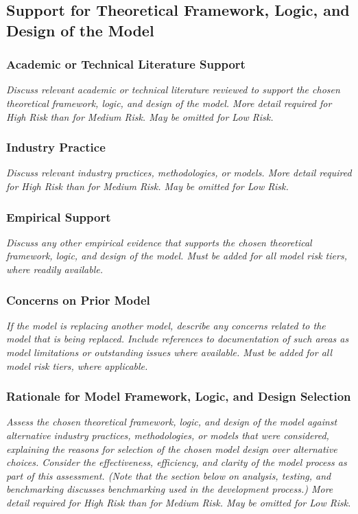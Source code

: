 \documentclass[12pt,letterpaper]{article}
\begin{document}
\subsection{Support for Theoretical Framework, Logic, and Design of the Model}

\subsubsection{Academic or Technical Literature Support}
\textit{Discuss relevant academic or technical literature reviewed to support the chosen theoretical framework, logic, and design of the model. More detail required for High Risk than for Medium Risk. May be omitted for Low Risk.}

\subsubsection{Industry Practice}
\textit{Discuss relevant industry practices, methodologies, or models. More detail required for High Risk than for Medium Risk. May be omitted for Low Risk.}

\subsubsection{Empirical Support}
\textit{Discuss any other empirical evidence that supports the chosen theoretical framework, logic, and design of the model. Must be added for all model risk tiers, where readily available.}

\subsubsection{Concerns on Prior Model}
\textit{If the model is replacing another model, describe any concerns related to the model that is being replaced. Include references to documentation of such areas as model limitations or outstanding issues where available. Must be added for all model risk tiers, where applicable.}

\subsubsection{Rationale for Model Framework, Logic, and Design Selection}
\textit{Assess the chosen theoretical framework, logic, and design of the model against alternative industry practices, methodologies, or models that were considered, explaining the reasons for selection of the chosen model design over alternative choices. Consider the effectiveness, efficiency, and clarity of the model process as part of this assessment. (Note that the section below on analysis, testing, and benchmarking discusses benchmarking used in the development process.) More detail required for High Risk than for Medium Risk. May be omitted for Low Risk.}
\end{document}

